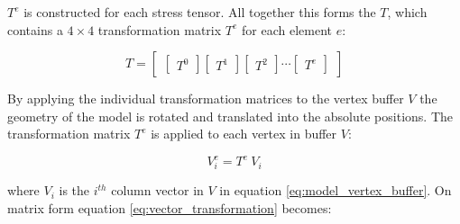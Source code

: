 $T^e$ is constructed for each stress tensor. All together this forms the
 $T$, which contains a $4 \times 4$ transformation
matrix $T^e$ for each element $e$:

\begin{equation}
\label{eq:tensor_matrix_buffer}
T = 
\begin{bmatrix} 
\begin{bmatrix} 
T^0
\end{bmatrix} 
\begin{bmatrix} 
T^1
\end{bmatrix} 
\begin{bmatrix} 
T^2
\end{bmatrix} 
\dotsb
\begin{bmatrix} 
T^e
\end{bmatrix} 
\end{bmatrix} 
\end{equation} 

By applying the individual
transformation matrices to the vertex buffer $V$ the geometry of the
model is rotated and translated into the absolute positions. The
transformation matrix $T^e$ is applied to each vertex in buffer $V$:

\begin{equation}
\label{eq:vector_transformation}
V^e_i = T^e \ V_i
\end{equation}

where $V_i$ is the $i^{th}$ column vector in $V$ in equation
\eqref{eq:model_vertex_buffer}. On matrix form equation
\eqref{eq:vector_transformation} becomes:

